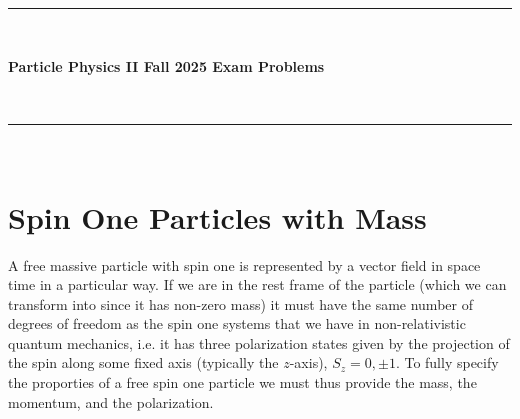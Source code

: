 \documentclass[working, oneside]{../../../Preambles/tuftebook}
\begin{document}
\let\cleardoublepage\clearpage
\thispagestyle{fancy}

\noindent\rule{\linewidth}{.5mm}\\[1.5ex]
\centerline{\Large\textbf{Particle Physics II Fall 2025 Exam Problems}}
\\[1ex]
\noindent\rule{\linewidth}{.5mm}\\[-1ex]

\chapter{Spin One Particles with Mass}
A free massive particle with spin one is represented by a 
vector field in space time in a particular way. If we are in the rest
frame of the particle (which we can transform into since it has non-zero
mass) it must have the same number of degrees of freedom as the spin one
systems that we have in non-relativistic quantum mechanics, i.e. it has 
three polarization states given by the projection of the spin along some 
fixed axis (typically the $z$-axis), $S_z=0,\pm 1$. To fully specify the 
proporties of a free spin one particle we must thus provide the mass, the 
momentum, and the polarization.
\end{document}
